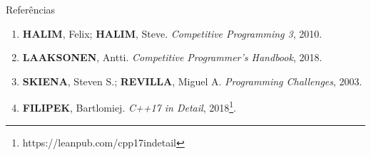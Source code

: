 \begin{frame}[fragile]{Referências}

    \begin{enumerate}
        \item \textbf{HALIM}, Felix; \textbf{HALIM}, Steve. \textit{Competitive Programming 3}, 2010.
        \item \textbf{LAAKSONEN}, Antti. \textit{Competitive Programmer's Handbook}, 2018.

        \item \textbf{SKIENA}, Steven S.; \textbf{REVILLA}, Miguel A. \textit{Programming
            Challenges}, 2003.

        \item \textbf{FILIPEK}, Bartlomiej. \textit{C++17 in Detail}, 2018\footnote{https://leanpub.com/cpp17indetail}.

    \end{enumerate}

\end{frame}
